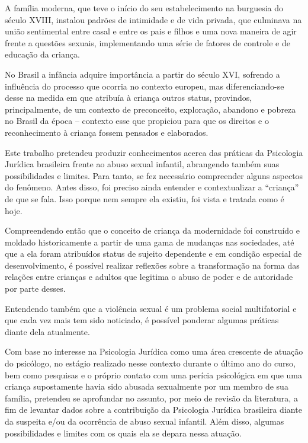 A família moderna, que teve o início do seu estabelecimento na burguesia do século XVIII, instalou padrões de intimidade e de vida privada, que culminava na união sentimental entre casal e entre os pais e filhos \cite{ARIES2011} e uma nova maneira de agir frente a questões sexuais, implementando uma série de fatores de controle e de educação da criança. 

No Brasil a infância adquire importância a partir do século XVI, sofrendo a influência do processo que ocorria no contexto europeu, mas diferenciando-se desse na medida em que atribuía à criança outros status, provindos, principalmente, de um contexto de preconceito, exploração, abandono e pobreza no Brasil da época – contexto esse que propiciou para que os direitos e o reconhecimento à criança fossem pensados e elaborados. 

Este trabalho pretendeu produzir conhecimentos acerca das práticas da Psicologia Jurídica brasileira frente ao abuso sexual infantil, abrangendo também suas possibilidades e limites. Para tanto, se fez necessário compreender alguns aspectos do fenômeno. Antes disso, foi preciso ainda entender e contextualizar a ``criança'' de que se fala. Isso porque nem sempre ela existiu, foi vista e tratada como é hoje. 

Compreendendo então que o conceito de criança da modernidade foi construído e moldado historicamente a partir de uma gama de mudanças nas sociedades, até que a ela foram atribuídos status de sujeito dependente e em condição especial de desenvolvimento, é possível realizar reflexões sobre a transformação na forma das relações entre crianças e adultos que legitima o abuso de poder e de autoridade por parte desses.

Entendendo também que a violência sexual é um problema social multifatorial e que cada vez mais tem sido noticiado, é possível ponderar algumas práticas diante dela atualmente.

Com base no interesse na Psicologia Jurídica como uma área crescente de atuação do psicólogo, no estágio realizado nesse contexto durante o último ano do curso, bem como pesquisas e o próprio contato com uma perícia psicológica em que uma criança supostamente havia sido abusada sexualmente por um membro de sua família, pretendeu se aprofundar no assunto, por meio de revisão da literatura, a fim de levantar dados sobre a contribuição da Psicologia Jurídica brasileira diante da suspeita e/ou da ocorrência de abuso sexual infantil. Além disso, algumas possibilidades e limites com os quais ela se depara nessa atuação. 

